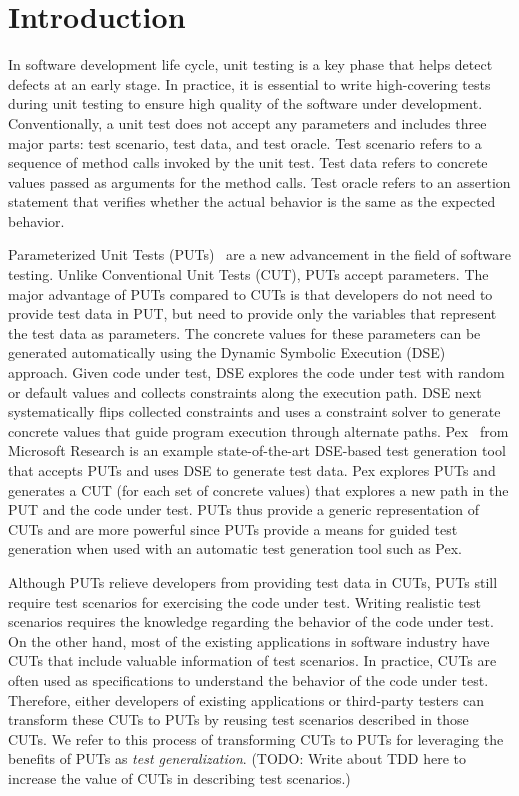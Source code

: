 \section{Introduction}
\label{sec:intro}

In software development life cycle, unit testing is a key phase that helps detect defects at an early stage. In practice, it is essential to write high-covering tests during unit testing to ensure high quality of the software under development. Conventionally, a unit test does not accept any parameters and includes three major parts: test scenario, test data, and test oracle. Test scenario refers to a sequence of method calls invoked by the unit test. Test data refers to concrete values passed as arguments for the method calls. Test oracle refers to an assertion statement that verifies whether the actual behavior is the same as the expected behavior. 

Parameterized Unit Tests (PUTs)~\cite{tillmann05:parameterized} are a new advancement in the field of software testing. Unlike Conventional Unit Tests (CUT), PUTs accept parameters. The major advantage of PUTs compared to CUTs is that developers do not need to provide test data in PUT, but need to provide only the variables that represent the test data as parameters. The concrete values for these parameters can be generated automatically using the Dynamic Symbolic Execution (DSE)~\cite{king:symex, godefroid05:dart, sen07:cute} approach. Given code under test, DSE explores the code under test with random or default values and collects constraints along the execution path. DSE next systematically flips collected constraints and uses a constraint solver to generate concrete values that guide program execution through alternate paths. Pex~\cite{tillmann08:pex, pex:rel} from Microsoft Research is an example state-of-the-art DSE-based test generation tool that accepts PUTs and uses DSE to generate test data. Pex explores PUTs and generates a CUT (for each set of concrete values) that explores a new path in the PUT and the code under test. PUTs thus provide a generic representation of CUTs and are more powerful since PUTs provide a means for guided test generation when used with an automatic test generation tool such as Pex. 

Although PUTs relieve developers from providing test data in CUTs, PUTs still require test scenarios for exercising the code under test. Writing realistic test scenarios requires the knowledge regarding the behavior of the code under test. On the other hand, most of the existing applications in software industry have CUTs that include valuable information of test scenarios. In practice, CUTs are often used as specifications to understand the behavior of the code under test. Therefore, either developers of existing applications or third-party testers can transform these CUTs to PUTs by reusing test scenarios described in those CUTs. We refer to this process of transforming CUTs to PUTs for leveraging the benefits of PUTs as \emph{test generalization}. (TODO: Write about TDD here to increase the value of CUTs in describing test scenarios.)


